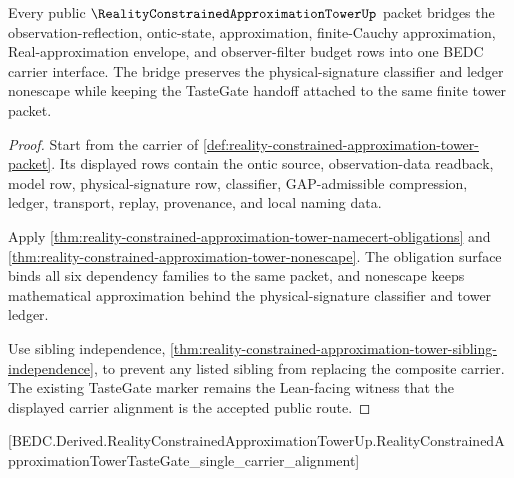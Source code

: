 \begin{theorem}
\label{thm:reality-constrained-approximation-tower-bridge-surface}
Every public $\RealityConstrainedApproximationTowerUp$ packet bridges the observation-reflection, ontic-state, approximation, finite-Cauchy approximation, Real-approximation envelope, and observer-filter budget rows into one BEDC carrier interface. The bridge preserves the physical-signature classifier and ledger nonescape while keeping the TasteGate handoff attached to the same finite tower packet.
\end{theorem}
\begin{proof}
Start from the carrier of \autoref{def:reality-constrained-approximation-tower-packet}. Its displayed rows contain the ontic source, observation-data readback, model row, physical-signature row, classifier, GAP-admissible compression, ledger, transport, replay, provenance, and local naming data.

Apply \autoref{thm:reality-constrained-approximation-tower-namecert-obligations} and \autoref{thm:reality-constrained-approximation-tower-nonescape}. The obligation surface binds all six dependency families to the same packet, and nonescape keeps mathematical approximation behind the physical-signature classifier and tower ledger.

Use sibling independence, \autoref{thm:reality-constrained-approximation-tower-sibling-independence}, to prevent any listed sibling from replacing the composite carrier. The existing TasteGate marker remains the Lean-facing witness that the displayed carrier alignment is the accepted public route.
\end{proof}

[BEDC.Derived.RealityConstrainedApproximationTowerUp.RealityConstrainedApproximationTowerTasteGate\_single\_carrier\_alignment]

